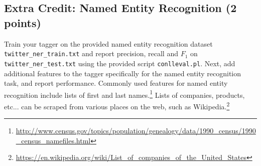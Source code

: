 \documentclass[12pt, letterpaper]{article}
\begin{document}
\subsection*{Extra Credit: Named Entity Recognition (2 points)}
Train your tagger on the provided named entity recognition dataset {\tt twitter\_ner\_train.txt} and report
precision, recall and $F_1$ on {\tt twitter\_ner\_test.txt} using the provided script {\tt conlleval.pl}.
Next, add additional features to the tagger specifically for the named entity recognition task, and report performance.
Commonly used features for named entity recognition include lists of first and last names.\footnote{\url{http://www.census.gov/topics/population/genealogy/data/1990\_census/1990\_census\_namefiles.html}}
Lists of companies, products, etc... can be scraped from various places on the web, such as Wikipedia.\footnote{\url{https://en.wikipedia.org/wiki/List\_of\_companies\_of\_the\_United\_States}}
\end{document}
